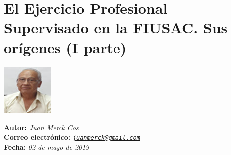 \documentclass[11pt,spanish,Letterpaper,openany]{book}
\begin{document}
\hypertarget{jmerck}{%
\chapter{El Ejercicio Profesional Supervisado en la FIUSAC. Sus orígenes (I parte)}\label{jmerck}}

\begin {flushleft}

\begin{tcolorbox}[sharp corners=uphill, colback=fondo, colframe=fondo, arc=6mm, boxrule=0mm, boxsep=2mm,  opacityframe=0.19,  opacityback=0.19]

\begin{minipage}[c]{3cm}

\includegraphics[width=2.5cm,height=\textheight]{images/201901-jmerck-photo.jpg}

\end{minipage}\begin{minipage}[c]{12cm}

\textbf{Autor:} \emph{Juan Merck Cos}\\
\textbf{Correo electrónico:} \emph{\href{mailto:juanmerck@gmail.com}{\nolinkurl{juanmerck@gmail.com}}}\\
\textbf{Fecha:} \emph{02 de mayo de 2019}

\end{minipage}

\end {tcolorbox}

\end {flushleft}
\end{document}
